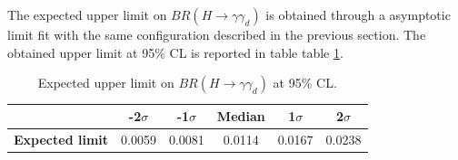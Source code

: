 
The expected upper limit on $BR(H\rightarrow \gamma \gamma_d)$ is obtained through a asymptotic limit fit with the same configuration described in the previous section. The obtained upper limit at 95\% CL is reported in table table \ref{tab:limit_syst}.\\

\begin{table}[ht!]
    \centering
    \begin{tabular}{|c|c|c|c|c|c|}
    \hline
       & \textbf{-2$\sigma$} & \textbf{-1$\sigma$} & \textbf{Median} & \textbf{1$\sigma$} & \textbf{2$\sigma$} \\
       \hline
     \textbf{Expected limit} & 0.0059 &  0.0081 &  0.0114 & 0.0167 & 0.0238 \\
     \hline
    \end{tabular}
    \caption{Expected upper limit on $BR(H\rightarrow \gamma \gamma_d)$ at 95\% CL.}
    \label{tab:limit_syst}
\end{table}
